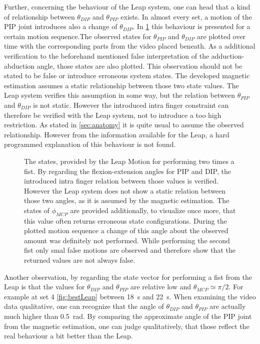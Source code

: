 Further, concerning the behaviour of the Leap system, one can head that a kind of relationship between $ \theta_{DIP} $ and $ \theta_{PIP} $ exists. In almost every set, a motion of the \ac{PIP} joint introduces also a change of $ \theta_{DIP} $. In \ref{fig:set14} this behaviour is presented for a certain motion sequence.The observed states for $ \theta_{PIP} $ and $ \theta_{DIP} $ are plotted over time with the corresponding parts from the video placed beneath. As a additional verification to the beforehand mentioned false interpretation of the adduction-abduction angle, those states are also plotted. This observation should not be stated to be false or introduce erroneous system states. The developed magnetic estimation assumes a static relationship between those two state values. The Leap system verifies this assumption in some way, but the relation between $ \theta_{PIP} $ and $ \theta_{DIP} $ is not static. However the introduced intra finger constraint can therefore be verified with the Leap system, not to introduce a too high restriction. As stated in \ref{sec:anatomy} it is quite usual to assume the observed relationship. However from the information available for the Leap, a hard programmed explanation of this behaviour is not found. 
\begin{figure}
\centering
{}
\caption[Relationship between $ \theta_{PIP} $ and $ \theta_{DIP} $ observed by Leap Motion]
{The states, provided by the Leap Motion for performing two times a fist. By regarding the flexion-extension angles for \ac{PIP} and \ac{DIP}, the introduced intra finger relation between those values is verified. However the Leap system does not show a static relation between those two angles, as it is assumed by the magnetic estimation. The states of $ \phi_{MCP} $ are provided additionally, to visualize once more, that this value often returns erroneous state configurations. During the plotted motion sequence a change of this angle about the observed amount was definitely not performed. While performing the second fist only smal false motions are observed and therefore show that the returned values are not always false.}
\label{fig:set14}
\end{figure}
Another observation, by regarding the state vector for performing a fist from the Leap is that the values for $ \theta_{DIP} $ and $ \theta_{PIP} $ are relative low and $ \theta_{MCP} \simeq \pi/2 $. For example at set 4 \ref{fig:bestLeap} between \SI{18}{\second} and \SI{22}{\second}. When examining the video data qualitative, one can recognize that the angle of $ \theta_{DIP} $ and $ \theta_{PIP} $ are actually much higher than \SI{0.5}{\radian}. By comparing the approximate angle of the \ac{PIP} joint from the magnetic estimation, one can judge qualitatively, that those reflect the real behaviour a bit better than the Leap. 

